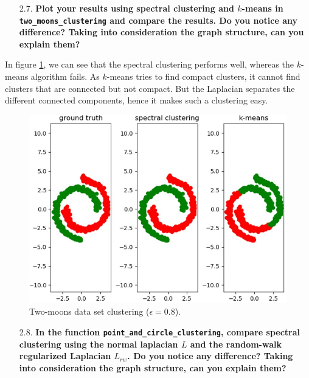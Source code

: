 \documentclass[a4paper, 11pt]{report}
\begin{document}
\begin{itemize}
    \item[2.7.] \textbf{Plot your results using spectral clustering and $k$-means in \texttt{two\_moons\_clustering} and compare the results. Do you notice any difference? Taking into consideration the graph structure, can you explain them?}
\end{itemize}

    In figure \ref{fig:question-27-results}, we can see that the spectral clustering performs well, whereas the $k$-means algorithm fails. As $k$-means tries to find compact clusters, it cannot find clusters that are connected but not compact. But the Laplacian separates the different connected components, hence it makes such a clustering easy.

    \begin{figure}[!h]
        \centering
        \includegraphics[scale=0.6]{images/question_27_results.jpg}
        \caption{Two-moons data set clustering ($\epsilon = 0.8$).}
        \label{fig:question-27-results}
    \end{figure}

\begin{itemize}
    \item[2.8.] \textbf{In the function \texttt{point\_and\_circle\_clustering}, compare spectral clustering using the normal laplacian $L$ and the random-walk regularized Laplacian $L_{rw}$. Do you notice any difference? Taking into consideration the graph structure, can you explain them?}
\end{itemize}
\end{document}
